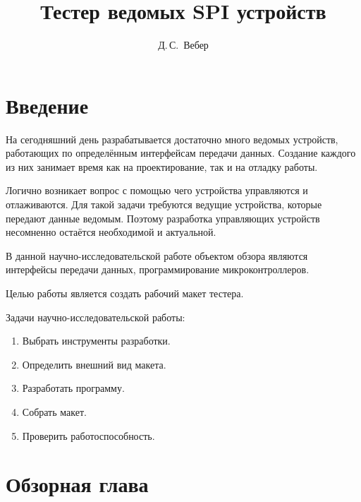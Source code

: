 \documentclass[14pt, oneside]{altsu-report}
\title{Тестер ведомых SPI устройств}
\author{Д.\,С.~Вебер}
\institute{Институт цифровых технологий, электроники и физики}
\date{\the\year}
\begin{document}
\maketitle
\setcounter{page}{2}
\makeabstract
\tableofcontents

\chapter*{Введение}
	На сегодняшний день разрабатывается достаточно много ведомых устройств, работающих по определённым интерфейсам передачи данных. Создание каждого из них занимает время как на проектирование, так и на отладку работы.
	
	Логично возникает вопрос с помощью чего устройства управляются и отлаживаются. Для такой задачи требуются ведущие устройства, которые передают данные ведомым. Поэтому разработка управляющих устройств несомненно остаётся необходимой и актуальной.
	
	В данной научно-исследовательской работе объектом обзора являются интерфейсы передачи данных, программирование микроконтроллеров. 
	
	Целью работы является создать рабочий макет тестера.
	
	Задачи научно-исследовательской работы:  
	\begin{enumerate}
		\item Выбрать инструменты разработки.
		\item Определить внешний вид макета. %
		\item Разработать программу.
		\item Собрать макет.
		\item Проверить работоспособность.
	\end{enumerate}

\chapter{Обзорная глава} %
\end{document}
